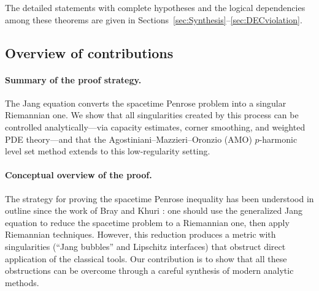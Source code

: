 \noindent The detailed statements with complete hypotheses and the logical dependencies among these theorems are given in Sections~\ref{sec:Synthesis}--\ref{sec:DECviolation}.

\subsection{Overview of contributions}

\paragraph{Summary of the proof strategy.} The Jang equation converts the spacetime Penrose problem into a singular Riemannian one. We show that all singularities created by this process can be controlled analytically---via capacity estimates, corner smoothing, and weighted PDE theory---and that the Agostiniani--Mazzieri--Oronzio (AMO) $p$-harmonic level set method extends to this low-regularity setting.

\paragraph{Conceptual overview of the proof.}
The strategy for proving the spacetime Penrose inequality has been understood in outline since the work of Bray and Khuri \cite{braykhuri2010}: one should use the generalized Jang equation to reduce the spacetime problem to a Riemannian one, then apply Riemannian techniques. However, this reduction produces a metric with singularities (``Jang bubbles'' and Lipschitz interfaces) that obstruct direct application of the classical tools. Our contribution is to show that all these obstructions can be overcome through a careful synthesis of modern analytic methods.

